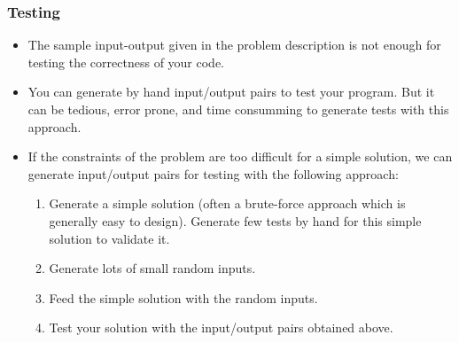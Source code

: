 \documentclass{beamer}
\begin{document}
\begin{frame}%
\frametitle{Testing}

\footnotesize

\begin{itemize}

\item The sample input-output given in the problem description is not enough for testing the correctness of your code.

\vspace{0.2cm}

\item<2-> You can generate by hand input/output pairs to test your program. But it can be tedious, error prone,
and time consumming to generate tests with this approach.

\vspace{0.2cm}

\item<3-> If the constraints of the problem are too difficult for a simple solution, we can generate
input/output pairs for testing with the following approach:

\begin{enumerate}
\footnotesize

\item<4-> Generate a simple solution (often a brute-force approach which is generally easy to design). Generate few tests by hand
for this simple solution to validate it.

\vspace{0.1cm}

\item<5-> Generate lots of small random inputs.

\vspace{0.1cm}

\item<6-> Feed the simple solution with the random inputs.

\vspace{0.1cm}

\item<7-> Test your solution with the input/output pairs obtained above.

\end{enumerate}

\end{itemize}

\end{frame}
\end{document}
